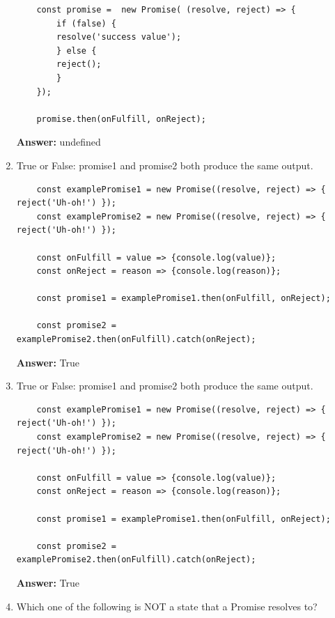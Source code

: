 \documentclass[12pt]{article}
\begin{document}
\begin{enumerate}
\begin{lstlisting}
    const promise =  new Promise( (resolve, reject) => {
        if (false) {
        resolve('success value');
        } else {
        reject();
        }
    });

    promise.then(onFulfill, onReject);
    \end{lstlisting}

    \bigskip

    \textbf{Answer:} undefined

    \item True or False: promise1 and promise2 both produce the same output.

    \begin{lstlisting}
    const examplePromise1 = new Promise((resolve, reject) => { reject('Uh-oh!') });
    const examplePromise2 = new Promise((resolve, reject) => { reject('Uh-oh!') });

    const onFulfill = value => {console.log(value)};
    const onReject = reason => {console.log(reason)};

    const promise1 = examplePromise1.then(onFulfill, onReject);

    const promise2 = examplePromise2.then(onFulfill).catch(onReject);
    \end{lstlisting}

    \bigskip

    \textbf{Answer:} True

    \item True or False: promise1 and promise2 both produce the same output.

    \begin{lstlisting}
    const examplePromise1 = new Promise((resolve, reject) => { reject('Uh-oh!') });
    const examplePromise2 = new Promise((resolve, reject) => { reject('Uh-oh!') });

    const onFulfill = value => {console.log(value)};
    const onReject = reason => {console.log(reason)};

    const promise1 = examplePromise1.then(onFulfill, onReject);

    const promise2 = examplePromise2.then(onFulfill).catch(onReject);
    \end{lstlisting}

    \bigskip

    \textbf{Answer:} True

    \item Which one of the following is NOT a state that a Promise resolves to?

    \bigskip


\end{enumerate}
\end{document}
